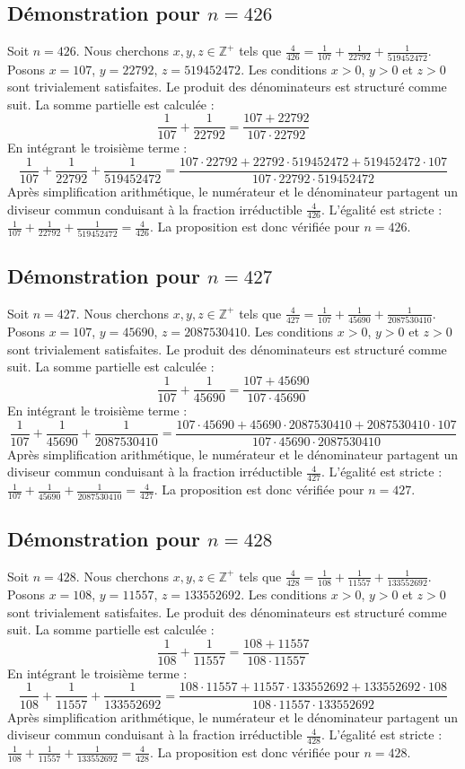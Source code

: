 \documentclass[11pt,a4paper]{article}
\begin{document}
\subsection{Démonstration pour $n = 426$}
Soit $n = 426$. Nous cherchons $x, y, z \in \mathbb{Z}^{+}$ tels que $\frac{4}{426} = \frac{1}{107} + \frac{1}{22792} + \frac{1}{519452472}$.
Posons $x = 107$, $y = 22792$, $z = 519452472$.
Les conditions $x > 0$, $y > 0$ et $z > 0$ sont trivialement satisfaites.
Le produit des dénominateurs est structuré comme suit. La somme partielle est calculée :
$$ \frac{1}{107} + \frac{1}{22792} = \frac{107+22792}{107 \cdot 22792} $$
En intégrant le troisième terme :
$$ \frac{1}{107} + \frac{1}{22792} + \frac{1}{519452472} = \frac{107 \cdot 22792 + 22792 \cdot 519452472 + 519452472 \cdot 107}{107 \cdot 22792 \cdot 519452472} $$
Après simplification arithmétique, le numérateur et le dénominateur partagent un diviseur commun conduisant à la fraction irréductible $\frac{4}{426}$.
L'égalité est stricte : $\frac{1}{107} + \frac{1}{22792} + \frac{1}{519452472} = \frac{4}{426}$.
La proposition est donc vérifiée pour $n = 426$.
\subsection{Démonstration pour $n = 427$}
Soit $n = 427$. Nous cherchons $x, y, z \in \mathbb{Z}^{+}$ tels que $\frac{4}{427} = \frac{1}{107} + \frac{1}{45690} + \frac{1}{2087530410}$.
Posons $x = 107$, $y = 45690$, $z = 2087530410$.
Les conditions $x > 0$, $y > 0$ et $z > 0$ sont trivialement satisfaites.
Le produit des dénominateurs est structuré comme suit. La somme partielle est calculée :
$$ \frac{1}{107} + \frac{1}{45690} = \frac{107+45690}{107 \cdot 45690} $$
En intégrant le troisième terme :
$$ \frac{1}{107} + \frac{1}{45690} + \frac{1}{2087530410} = \frac{107 \cdot 45690 + 45690 \cdot 2087530410 + 2087530410 \cdot 107}{107 \cdot 45690 \cdot 2087530410} $$
Après simplification arithmétique, le numérateur et le dénominateur partagent un diviseur commun conduisant à la fraction irréductible $\frac{4}{427}$.
L'égalité est stricte : $\frac{1}{107} + \frac{1}{45690} + \frac{1}{2087530410} = \frac{4}{427}$.
La proposition est donc vérifiée pour $n = 427$.
\subsection{Démonstration pour $n = 428$}
Soit $n = 428$. Nous cherchons $x, y, z \in \mathbb{Z}^{+}$ tels que $\frac{4}{428} = \frac{1}{108} + \frac{1}{11557} + \frac{1}{133552692}$.
Posons $x = 108$, $y = 11557$, $z = 133552692$.
Les conditions $x > 0$, $y > 0$ et $z > 0$ sont trivialement satisfaites.
Le produit des dénominateurs est structuré comme suit. La somme partielle est calculée :
$$ \frac{1}{108} + \frac{1}{11557} = \frac{108+11557}{108 \cdot 11557} $$
En intégrant le troisième terme :
$$ \frac{1}{108} + \frac{1}{11557} + \frac{1}{133552692} = \frac{108 \cdot 11557 + 11557 \cdot 133552692 + 133552692 \cdot 108}{108 \cdot 11557 \cdot 133552692} $$
Après simplification arithmétique, le numérateur et le dénominateur partagent un diviseur commun conduisant à la fraction irréductible $\frac{4}{428}$.
L'égalité est stricte : $\frac{1}{108} + \frac{1}{11557} + \frac{1}{133552692} = \frac{4}{428}$.
La proposition est donc vérifiée pour $n = 428$.
\end{document}
